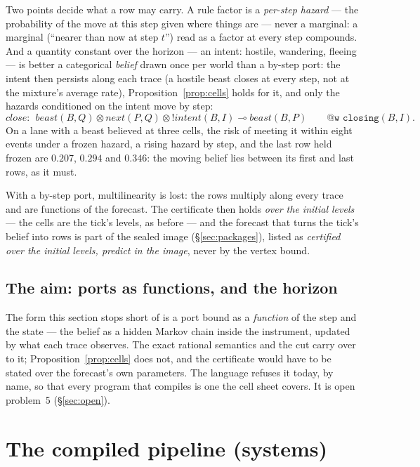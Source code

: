 \documentclass[11pt]{article}
\newcommand{\lolli}{\multimap}
\newcommand{\tensor}{\otimes}
\newcommand{\bang}{\mathord{!}}
\theoremstyle{plain}
\theoremstyle{definition}
\theoremstyle{remark}
\begin{document}
Two points decide what a row may carry. A rule factor is a \emph{per-step
hazard} --- the probability of the move at this step given where things
are --- never a marginal: a marginal (``nearer than now at step $t$'')
read as a factor at every step compounds. And a quantity constant over
the horizon --- an intent: hostile, wandering, fleeing --- is better a
categorical \emph{belief} drawn once per world than a by-step port: the
intent then persists along each trace (a hostile beast closes at every
step, not at the mixture's average rate), Proposition~\ref{prop:cells}
holds for it, and only the hazards conditioned on the intent move by
step:
\[
  \mathit{close}:\ \ \mathit{beast}(B,Q) \tensor \mathit{next}(P,Q)
  \tensor \bang\mathit{intent}(B,I) \lolli \mathit{beast}(B,P)
  \qquad \texttt{@w closing}(B,I).
\]
On a lane with a beast believed at three cells, the risk of meeting it
within eight events under a frozen hazard, a rising hazard by step, and
the last row held frozen are $0.207$, $0.294$ and $0.346$: the moving
belief lies between its first and last rows, as it must.

With a by-step port, multilinearity is lost: the rows multiply along
every trace and are functions of the forecast. The certificate then
holds \emph{over the initial levels} --- the cells are the tick's
levels, as before --- and the forecast that turns the tick's belief into
rows is part of the sealed image (\S\ref{sec:packages}), listed as
\emph{certified over the initial levels, predict in the image}, never
by the vertex bound.

\subsection{The aim: ports as functions, and the horizon}

The form this section stops short of is a port bound as a \emph{function}
of the step and the state --- the belief as a hidden Markov chain inside
the instrument, updated by what each trace observes. The exact rational
semantics and the cut carry over to it; Proposition~\ref{prop:cells}
does not, and the certificate would have to be stated over the
forecast's own parameters. The language refuses it today, by name, so
that every program that compiles is one the cell sheet covers. It is
open problem~5 (\S\ref{sec:open}).

\section{The compiled pipeline (systems)}\label{sec:pipeline}
\end{document}
